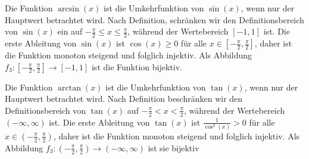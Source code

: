 {\begin{iii}
\item
Die Funktion $\arcsin(x)$ ist die Umkehrfunktion von $\sin(x)$, wenn nur der Hauptwert betrachtet wird.
Nach Definition, schr\"anken wir den Definitionsbereich von $\sin(x)$ ein auf $-\frac{\pi}{2} \leq x \leq \frac{\pi}{2}$, 
w\"ahrend der Wertebereich $[-1,1]$ ist.
Die erste Ableitung von $\sin(x)$ ist $\cos(x) \geq 0$ f\"ur alle $x \in [-\frac{\pi}{2},\frac{\pi}{2}]$,
daher ist die Funktion monoton steigend und folglich injektiv.
Als Abbildung $f_3 : [-\frac{\pi}{2},\frac{\pi}{2}] \to [-1,1]$ ist die Funktion bijektiv.
\newpage
\item
Die Funktion $\arctan(x)$ ist die Umkehrfunktion von $\tan(x)$, wenn nur der Hauptwert betrachtet wird. 
Nach Definition beschr\"anken wir den Definitionsbereich von $\tan(x)$ auf $-\frac{\pi}{2}< x <\frac{\pi}{2}$, 
w\"ahrend der Wertebereich $(-\infty,\infty)$ ist.
Die erste Ableitung von $\tan(x)$ ist $\frac{1}{\cos^2(x)} > 0$ f\"ur alle $x \in (-\frac{\pi}{2},\frac{\pi}{2})$, daher ist die Funktion 
monoton steigend und folglich injektiv. 
Als Abbildung $f_3 : (-\frac{\pi}{2},\frac{\pi}{2}) \to (-\infty,\infty)$ ist sie bijektiv
%
%
%
%
%
%
%
%


\end{iii}}
